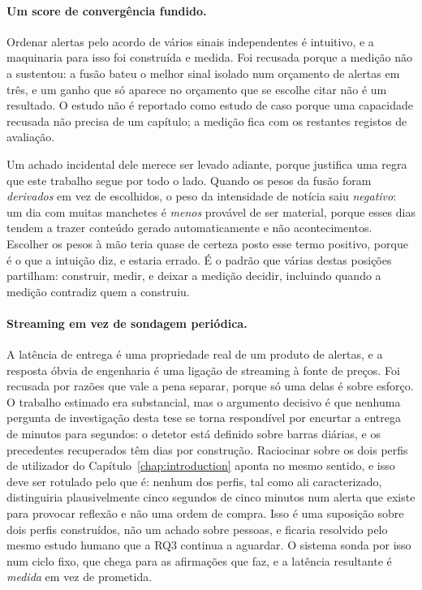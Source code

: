 \paragraph{Um score de convergência fundido.} Ordenar alertas pelo acordo de vários sinais
independentes é intuitivo, e a maquinaria para isso foi construída e medida. Foi recusada porque a
medição não a sustentou: a fusão bateu o melhor sinal isolado num orçamento de alertas em três, e um
ganho que só aparece no orçamento que se escolhe citar não é um resultado. O estudo não é reportado
como estudo de caso porque uma capacidade recusada não precisa de um capítulo; a medição fica com os
restantes registos de avaliação.

Um achado incidental dele merece ser levado adiante, porque justifica uma regra que este trabalho
segue por todo o lado. Quando os pesos da fusão foram \emph{derivados} em vez de escolhidos, o peso
da intensidade de notícia saiu \emph{negativo}: um dia com muitas manchetes é \emph{menos} provável
de ser material, porque esses dias tendem a trazer conteúdo gerado automaticamente e não
acontecimentos. Escolher os pesos à mão teria quase de certeza posto esse termo positivo, porque é o
que a intuição diz, e estaria errado. É o padrão que várias destas posições partilham: construir,
medir, e deixar a medição decidir, incluindo quando a medição contradiz quem a construiu.

\paragraph{Streaming em vez de sondagem periódica.} A latência de entrega é uma propriedade real de um
produto de alertas, e a resposta óbvia de engenharia é uma ligação de streaming à fonte de preços. Foi
recusada por razões que vale a pena separar, porque só uma delas é sobre esforço. O trabalho estimado
era substancial, mas o argumento decisivo é que nenhuma pergunta de investigação desta tese se torna
respondível por encurtar a entrega de minutos para segundos: o detetor está definido sobre barras
diárias, e os precedentes recuperados têm dias por construção. Raciocinar sobre os dois perfis de
utilizador do Capítulo~\ref{chap:introduction} aponta no mesmo sentido, e isso deve ser rotulado pelo que
é: nenhum dos perfis, tal como ali caracterizado, distinguiria plausivelmente cinco segundos de cinco
minutos num alerta que existe para provocar reflexão e não uma ordem de compra. Isso é uma suposição
sobre dois perfis construídos, não um achado sobre pessoas, e ficaria resolvido pelo mesmo estudo humano
que a RQ3 continua a aguardar. O sistema sonda por isso num ciclo fixo, que chega para as afirmações que
faz, e a latência resultante é \emph{medida} em vez de prometida.

